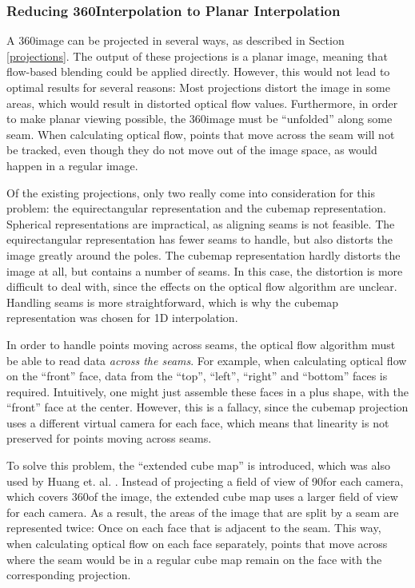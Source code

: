 \subsubsection{Reducing 360\degree Interpolation to Planar Interpolation}

A 360\degree image can be projected in several ways, as described in Section \ref{projections}. The output of these projections is a planar image, meaning that flow-based blending could be applied directly. However, this would not lead to optimal results for several reasons: Most projections distort the image in some areas, which would result in distorted optical flow values. Furthermore, in order to make planar viewing possible, the 360\degree image must be ``unfolded'' along some seam. When calculating optical flow, points that move across the seam will not be tracked, even though they do not move out of the image space, as would happen in a regular image.

Of the existing projections, only two really come into consideration for this problem: the equirectangular representation and the cubemap representation. Spherical representations are impractical, as aligning seams is not feasible. The equirectangular representation has fewer seams to handle, but also distorts the image greatly around the poles. The cubemap representation hardly distorts the image at all, but contains a number of seams. In this case, the distortion is more difficult to deal with, since the effects on the optical flow algorithm are unclear. Handling seams is more straightforward, which is why the cubemap representation was chosen for 1D interpolation.

In order to handle points moving across seams, the optical flow algorithm must be able to read data \emph{across the seams}. For example, when calculating optical flow on the ``front'' face, data from the ``top'', ``left'', ``right'' and ``bottom'' faces is required. Intuitively, one might just assemble these faces in a plus shape, with the ``front'' face at the center. However, this is a fallacy, since the cubemap projection uses a different virtual camera for each face, which means that linearity is not preserved for points moving across seams.


To solve this problem, the ``extended cube map'' is introduced, which was also used by Huang et. al. \cite{6dof}. Instead of projecting a field of view of 90\degree for each camera, which covers 360\degree of the image, the extended cube map uses a larger field of view for each camera. As a result, the areas of the image that are split by a seam are represented twice: Once on each face that is adjacent to the seam. This way, when calculating optical flow on each face separately, points that move across where the seam would be in a regular cube map remain on the face with the corresponding projection. 

